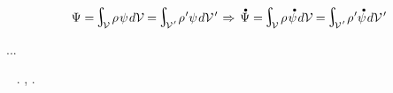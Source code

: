 \nopagebreak\begin{equation*}
\Psi = \hspace{-0.25ex}\scalebox{1.4}{$\integral$}_{\hspace{-0.5ex}\raisemath{-0.05em}{\mathcal{V}}} \hspace{.3ex} \rho \hspace{.2ex} \psi \hspace{.2ex} d\mathcal{V} \hspace{-0.1ex}
= \hspace{-0.2ex} \scalebox{1.4}{$\integral$}_{\hspace{-0.5ex}\raisemath{-0.05em}{\mathcal{V}\hspace{.12ex}'}} \hspace{.2ex} \rho \hspace{.1ex}' \psi \hspace{.2ex} d\mathcal{V}\hspace{.2ex}'
\hspace{.2ex} \Rightarrow \hspace{.33ex}
\mathdotabove{\Psi} = \hspace{-0.25ex}\scalebox{1.4}{$\integral$}_{\hspace{-0.5ex}\raisemath{-0.05em}{\mathcal{V}}} \hspace{.3ex} \rho \hspace{.2ex} \mathdotabove{\psi} \hspace{.2ex} d\mathcal{V} \hspace{-0.1ex}
= \hspace{-0.2ex} \scalebox{1.4}{$\integral$}_{\hspace{-0.5ex}\raisemath{-0.05em}{\mathcal{V}\hspace{.12ex}'}} \hspace{.2ex} \rho \hspace{.1ex}' \mathdotabove{\psi} \hspace{.2ex} d\mathcal{V}\hspace{.2ex}'
\end{equation*}

...

   ~ .
 , .

